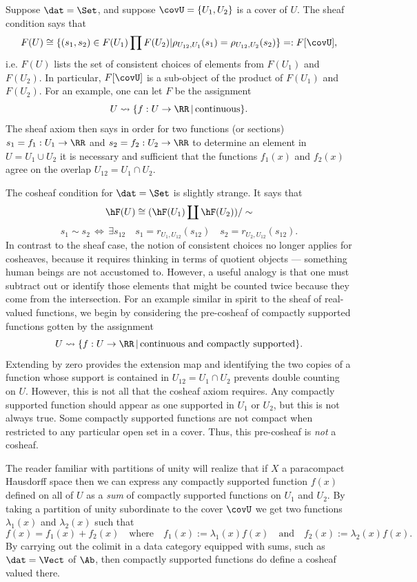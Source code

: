 \begin{ex}
Suppose $\dat=\Set$, and suppose $\covU=\{U_1,U_2\}$ is a cover of $U$. The sheaf condition says that
\[
	F(U)\cong\{(s_1,s_2)\in F(U_1)\prod F(U_2) | \rho_{U_{12},U_1}(s_1)=\rho_{U_{12},U_2}(s_2)\}=:F[\covU],
\]
i.e. $F(U)$ lists the set of consistent choices of elements from $F(U_1)$ and $F(U_2)$. In particular, $F[\covU]$ is a sub-object of the product of $F(U_1)$ and $F(U_2)$. For an example, one can let $F$ be the assignment
\[
	U \rightsquigarrow \{f:U\to\RR \,|\, \mathrm{continuous} \}.
\]
The sheaf axiom then says in order for two functions (or sections) $s_1=f_1:U_1\to\RR$ and $s_2=f_2:U_2\to\RR$ to determine an element in $U=U_1\cup U_2$ it is necessary and sufficient that the functions $f_1(x)$ and $f_2(x)$ agree on the overlap $U_{12}=U_1\cap U_2$.

The cosheaf condition for $\dat=\Set$ is slightly strange. It says that
\[
	\hF(U)\cong (\hF(U_1)\coprod \hF(U_2))/\sim
\]
\[
	s_1\sim s_2 \, \Leftrightarrow \, \exists s_{12} \quad s_1=r_{U_1,U_{12}}(s_{12}) \quad  s_2=r_{U_2,U_{12}}(s_{12}).
\]
	In contrast to the sheaf case, the notion of consistent choices no longer applies for cosheaves, because it requires thinking in terms of quotient objects --- something human beings are not accustomed to. However, a useful analogy is that one must subtract out or identify those elements that might be counted twice because they come from the intersection. For an example similar in spirit to the sheaf of real-valued functions, we begin by considering the pre-cosheaf of compactly supported functions gotten by the assignment
	\[
		U \rightsquigarrow \{f:U\to\RR \,|\, \mathrm{continuous}\,\,\mathrm{and}\,\,\mathrm{compactly}\,\,\mathrm{supported} \}.
	\]
	Extending by zero provides the extension map and identifying the two copies of a function whose support is contained in $U_{12}=U_1\cap U_2$ prevents double counting on $U$. However, this is not all that the cosheaf axiom requires. Any compactly supported function should appear as one supported in $U_1$ or $U_2$, but this is not always true. Some compactly supported functions are not compact when restricted to any particular open set in a cover. Thus, this pre-cosheaf is \emph{not} a cosheaf.
	
	The reader familiar with partitions of unity will realize that if $X$ a paracompact Hausdorff space then we can express any compactly supported function $f(x)$ defined on all of $U$ as a \emph{sum} of compactly supported functions on $U_1$ and $U_2$. By taking a partition of unity subordinate to the cover $\covU$ we get two functions $\lambda_1(x)$ and $\lambda_2(x)$ such that
	\[
		f(x)=f_1(x)+f_2(x) \quad \mathrm{where} \quad f_1(x):=\lambda_1(x)f(x) \quad \mathrm{and} \quad f_2(x):=\lambda_2(x)f(x).
	\]
	By carrying out the colimit in a data category equipped with sums, such as $\dat=\Vect$ of $\Ab$, then compactly supported functions do define a cosheaf valued there.


\end{ex}
